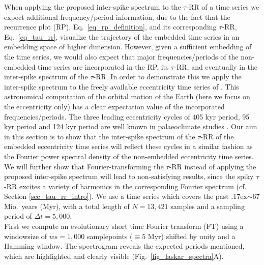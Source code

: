 \documentclass[entropy,article,submit,pdftex,moreauthors]{Definitions/mdpi}
\newcommand{\mytilde}{\raise.17ex\hbox{$\scriptstyle\mathtt{\sim}$}}
\begin{document}
When applying the proposed inter-spike spectrum to the $\tau$-RR of a time series we expect additional frequency/period information, due to the fact that the recurrence plot (RP), 
Eq.~\eqref{eq_rp_definition}, and its corresponding $\tau$-RR, Eq.~\eqref{eq_tau_rr}, visualize the trajectory of the embedded time series in an embedding space of higher dimension. 
However, given a sufficient embedding of the time series, we would also expect that major frequencies/periods of the non-embedded time series are incorporated in the RP, its $\tau$-RR, 
and eventually in the inter-spike spectrum of the $\tau$-RR. In order to demonstrate this we apply the inter-spike spectrum to the freely available eccentricity time series of \citet{Laskar2011}. 
This astronomical computation of the orbital motion of the Earth (here we focus on the eccentricity only) has a clear expectation value of the incorporated frequencies/periods. The three leading 
eccentricity cycles of 405 kyr period, 95 kyr period and 124 kyr period are well known in palaeoclimate studies \cite{Laskar2004,Westerhold2020}. Our aim in this section is to show that the inter-spike spectrum 
of the $\tau$-RR of the embedded eccentricity time series will reflect these cycles in a similar fashion as the Fourier power spectral density of the non-embedded eccentricity time series. We will further 
show that Fourier-transforming the $\tau$-RR instead of applying the proposed inter-spike spectrum will lead to non-satisfying results, since the spiky $\tau$-RR excites a variety of harmonics in 
the corresponding Fourier spectrum (cf. Section \ref{sec_tau_rr_intro}). We use a time series which covers the past \mytilde $67$ Mio.~years (Myr), with a total length of $N=13,421$ samples and a 
sampling period of $\Delta t= 5,000$.\\
First we compute an evolutionary short time Fourier transform (FT) using a windowsize of $ws=1,000$ samplepoints ($\equiv 5$ Myr) shifted by unity and a 
Hamming window. The spectrogram reveals the expected periods mentioned, which are highlighted and clearly visible (Fig.~\ref{fig_laskar_spectra}A). 
\end{document}
